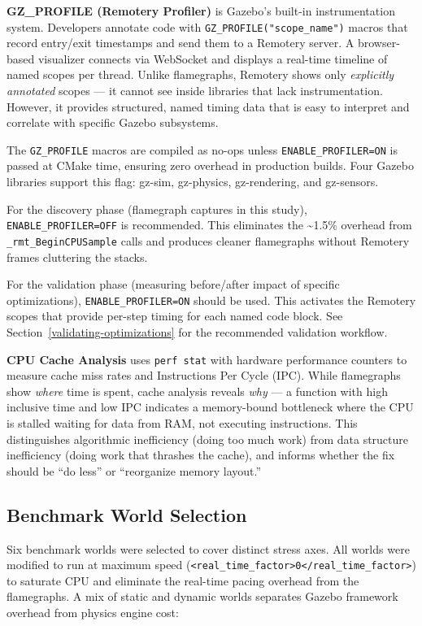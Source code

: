 \documentclass[11pt, a4paper]{article}
\begin{document}
\textbf{GZ\_PROFILE (Remotery Profiler)} is Gazebo's built-in
instrumentation system. Developers annotate code with
\texttt{GZ\_PROFILE("scope\_name")} macros that record entry/exit
timestamps and send them to a Remotery server. A browser-based
visualizer connects via WebSocket and displays a real-time timeline of
named scopes per thread. Unlike flamegraphs, Remotery shows only
\emph{explicitly annotated} scopes --- it cannot see inside libraries
that lack instrumentation. However, it provides structured, named timing
data that is easy to interpret and correlate with specific Gazebo
subsystems.

The \texttt{GZ\_PROFILE} macros are compiled as no-ops unless
\texttt{ENABLE\_PROFILER=ON} is passed at CMake time, ensuring zero
overhead in production builds. Four Gazebo libraries support this flag:
gz-sim, gz-physics, gz-rendering, and gz-sensors.

For the discovery phase (flamegraph captures in this study), \texttt{ENABLE\_PROFILER=OFF} is recommended. This eliminates the \textasciitilde1.5\% overhead from \texttt{\_rmt\_BeginCPUSample} calls and produces cleaner flamegraphs without Remotery frames cluttering the stacks.

For the validation phase (measuring before/after impact of specific optimizations), \texttt{ENABLE\_PROFILER=ON} should be used. This activates the Remotery scopes that provide per-step timing for each named code block. See Section~\ref{validating-optimizations} for the recommended validation workflow.

\textbf{CPU Cache Analysis} uses \texttt{perf stat} with hardware performance counters to measure cache miss rates and Instructions Per Cycle (IPC). While flamegraphs show \emph{where} time is spent, cache analysis reveals \emph{why} --- a function with high inclusive time and low IPC indicates a memory-bound bottleneck where the CPU is stalled waiting for data from RAM, not executing instructions. This distinguishes algorithmic inefficiency (doing too much work) from data structure inefficiency (doing work that thrashes the cache), and informs whether the fix should be ``do less'' or ``reorganize memory layout.''

\hypertarget{benchmark-world-selection}{%
\subsection{Benchmark World
Selection}\label{benchmark-world-selection}}

Six benchmark worlds were selected to cover distinct stress axes. All
worlds were modified to run at maximum speed
(\texttt{\textless{}real\_time\_factor\textgreater{}0\textless{}/real\_time\_factor\textgreater{}})
to saturate CPU and eliminate the real-time pacing overhead from the
flamegraphs. A mix of static and dynamic worlds separates Gazebo
framework overhead from physics engine cost:
\end{document}
